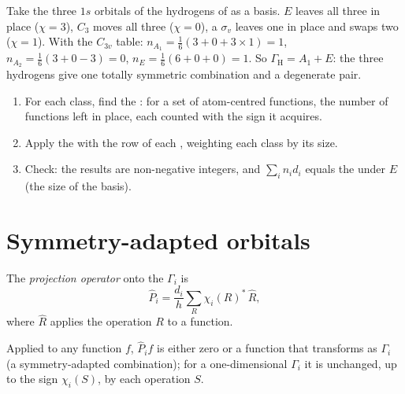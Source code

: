 \begin{example}\label{ex:b3:group-theory-applied:nh3}
Take the three $1s$ orbitals of the hydrogens of  as a basis. $E$
leaves all three in place ($\chi = 3$), $C_3$ moves all three ($\chi = 0$), a
$\sigma_v$ leaves one in place and swaps two ($\chi = 1$). With the $C_{3v}$ table:
$n_{A_1} = \frac16(3 + 0 + 3\times1) = 1$, $n_{A_2} = \frac16(3 + 0 - 3) = 0$,
$n_E = \frac16(6 + 0 + 0) = 1$. So $\Gamma_{\mathrm H} = A_1 + E$: the three
hydrogens give one totally symmetric combination and a degenerate pair.
\end{example}

\begin{method}\label{met:b3:group-theory-applied:reduce}
\begin{enumerate}
  \item For each class, find the : for a set of atom-centred
        functions, the number of functions left in place, each counted with
        the sign it acquires.
  \item Apply the  with the row of each , weighting each class by its size.
  \item Check: the results are non-negative integers, and $\sum_in_id_i$
        equals the  under $E$ (the size of the basis).
\end{enumerate}
\end{method}

\section{Symmetry-adapted orbitals}

\begin{definition}\label{def:b3:group-theory-applied:projection}
The \emph{projection operator} onto the
 $\Gamma_i$ is
\[
\hat P_i = \frac{d_i}{h}\sum_R\chi_i(R)^*\,\hat R,
\]
where $\hat R$ applies the operation $R$ to a function.
\end{definition}

\begin{proposition}\label{prop:b3:group-theory-applied:projection}
Applied to any function $f$, $\hat P_if$ is either zero or a function that
transforms as $\Gamma_i$ (a symmetry-adapted combination); for a
one-dimensional $\Gamma_i$ it is unchanged, up to the sign $\chi_i(S)$, by each
operation $S$.
\end{proposition}

